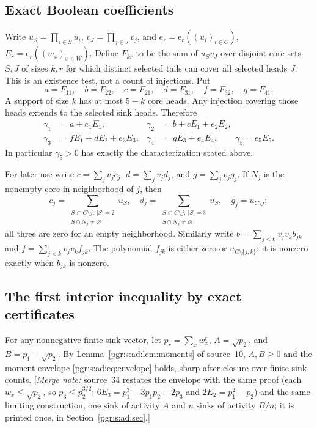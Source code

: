 \documentclass[11pt]{article}
\numberwithin{equation}{section}
\theoremstyle{definition}\newtheorem{definition}[theorem]{Definition}\newtheorem{remark}[theorem]{Remark}
\newcommand{\ee}{\mathrm e}                %
\newcommand{\mnote}[1]{[\textit{Merge note:} #1]}
\begin{document}
\subsection{Exact Boolean coefficients}
Write $u_S=\prod_{i\in S}u_i$, $v_J=\prod_{j\in J}v_j$, and
$e_r=\ee_r((u_i)_{i\in C})$, $E_r=\ee_r((w_x)_{x\in W})$.
Define $F_{kr}$ to be the sum of $u_Sv_J$ over disjoint core sets $S,J$ of sizes $k,r$ for which distinct selected tails can cover all selected heads $J$. This is an existence test, not a count of injections. Put
\[
 a=F_{11},\quad b=F_{22},\quad c=F_{21},\quad
 d=F_{31},\quad f=F_{32},\quad g=F_{41}.
\]
A support of size $k$ has at most $5-k$ core heads. Any injection covering those heads extends to the selected sink heads. Therefore
\begin{equation}\label{pgr:s:fc:eq:coeff}
\begin{aligned}
 \gamma_1&=a+e_1E_1,& \gamma_2&=b+cE_1+e_2E_2,\\
 \gamma_3&=fE_1+dE_2+e_3E_3,&
 \gamma_4&=gE_3+e_4E_4,\qquad \gamma_5=e_5E_5.
\end{aligned}
\end{equation}
In particular $\gamma_5>0$ has exactly the characterization stated above.

For later use write $c=\sum_jv_jc_j$, $d=\sum_jv_jd_j$, and $g=\sum_jv_jg_j$.
If $N_j$ is the nonempty core in-neighborhood of $j$, then
\[
 c_j=\sum_{\substack{S\subset C\setminus j,\ |S|=2\\S\cap N_j\ne\varnothing}}u_S,
 \quad d_j=\sum_{\substack{S\subset C\setminus j,\ |S|=3\\S\cap N_j\ne\varnothing}}u_S,
 \quad g_j=u_{C\setminus j};
\]
all three are zero for an empty neighborhood. Similarly write
$b=\sum_{j<k}v_jv_kb_{jk}$ and $f=\sum_{j<k}v_jv_kf_{jk}$.
The polynomial $f_{jk}$ is either zero or $u_{C\setminus\{j,k\}}$; it is nonzero exactly when $b_{jk}$ is nonzero.

\subsection{The first interior inequality by exact certificates}

For any nonnegative finite sink vector, let $p_r=\sum_xw_x^r$,
$A=\sqrt{p_2}$, and $B=p_1-\sqrt{p_2}$. By Lemma~\ref{pgr:s:ad:lem:moments}
of source~10, $A,B\ge0$ and the moment envelope \eqref{pgr:s:ad:eq:envelope}
holds, sharp after closure over finite sink counts.
\mnote{source~34 restates the envelope with the same proof (each
$w_x\le\sqrt{p_2}$, so $p_3\le p_2^{3/2}$; $6E_3=p_1^3-3p_1p_2+2p_3$ and
$2E_2=p_1^2-p_2$) and the same limiting construction, one sink of activity
$A$ and $n$ sinks of activity $B/n$; it is printed once, in
Section~\ref{pgr:s:ad:sec}.}
\end{document}
